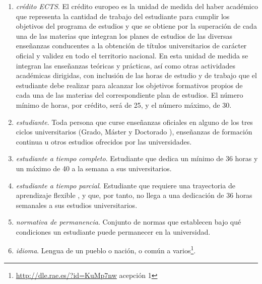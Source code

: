 \begin{enumerate}
    \item \emph{crédito ECTS}. El crédito europeo es la unidad de medida del
        haber académico que representa la cantidad de trabajo del estudiante
        para cumplir los objetivos del programa de estudios y que se obtiene
        por la superación de cada una de las materias que integran los planes
        de estudios de las diversas enseñanzas conducentes a la obtención de
        títulos universitarios de carácter oficial y validez en todo el
        territorio nacional. En esta unidad de medida se integran las
        enseñanzas teóricas y prácticas, así como otras actividades académicas
        dirigidas, con inclusión de las horas de estudio y de trabajo que el
        estudiante debe realizar para alcanzar los objetivos formativos propios
        de cada una de las materias del correspondiente plan de
        estudios\cite[artículo 3]{rdECTS}. El número mínimo de horas, por
        crédito, será de 25, y el número máximo, de 30\cite[artículo 4, apartado 
        5]{rdECTS}.

    \item \emph{estudiante}. Toda  persona  que  curse  enseñanzas  oficiales
        en alguno de los tres ciclos universitarios (Grado, Máster y Doctorado
        \cite[artículo 8]{rd1393}), enseñanzas de formación continua u otros
        estudios ofrecidos por las universidades\cite[artículo
        1, apartado 3]{estatutoEstudiante}.

    \item \emph{estudiante a tiempo completo}. Estudiante que dedica un mínimo
        de 36 horas y un máximo de 40 a la semana a sus
        universitarios\cite[artículo 4, apartado 4]{rdECTS}.

    \item \emph{estudiante a tiempo parcial}. Estudiante que requiere una
        trayectoria de aprendizaje flexible \cite[artículo 7, apartado 
        2]{estatutoEstudiante}, y que, por tanto, no llega a una dedicación de
        36 horas semanales a sus estudios universitarios. 

    \item \emph{normativa de permanencia}. Conjunto de normas que establecen
        bajo qué condiciones un estudiante puede permanecer en la universidad.

    \item \label{idioma} \emph{idioma}. Lengua de un pueblo o nación, o común a
        varios\footnote{\url{http://dle.rae.es/?id=KuMp7nw} acepción 1}.


\end{enumerate}
